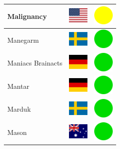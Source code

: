 \documentclass[12pt, a4paper, twoside]{report}
\begin{document}
\begin{center}
\begin{longtable}{|p{5cm}|p{2cm}|p{2cm}|}
 Malignancy                                                 & \includegraphics[width=1cm]{4x3/us} &   \includegraphics[width=1cm]{likes/m} \\ \hline
 Manegarm                                                   & \includegraphics[width=1cm]{4x3/se} &   \includegraphics[width=1cm]{likes/y} \\ \hline
 Maniacs Brainacts                                          & \includegraphics[width=1cm]{4x3/de} &   \includegraphics[width=1cm]{likes/y} \\ \hline
 Mantar                                                     & \includegraphics[width=1cm]{4x3/de} &   \includegraphics[width=1cm]{likes/y} \\ \hline
 Marduk                                                     & \includegraphics[width=1cm]{4x3/se} &   \includegraphics[width=1cm]{likes/y} \\ \hline
 Mason                                                      & \includegraphics[width=1cm]{4x3/au} &   \includegraphics[width=1cm]{likes/y} \\ \hline

\end{longtable}
\end{center}
\end{document}

